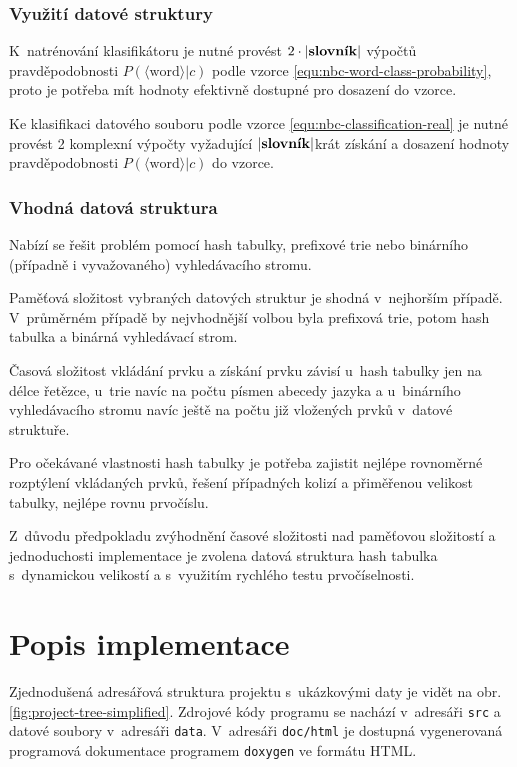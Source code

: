 \documentclass[a4paper, 12pt]{report}
\begin{document}
\subsection{Využití datové struktury}

K~natrénování klasifikátoru je nutné provést $2 \cdot 
|\text{\textbf{slovník}}|$ výpočtů pravděpodobnosti $P(\langle \text{word} 
\rangle|c)$ podle vzorce \ref{equ:nbc-word-class-probability}, proto je 
potřeba mít hodnoty efektivně dostupné pro dosazení do vzorce.

Ke klasifikaci datového souboru podle vzorce 
\ref{equ:nbc-classification-real} je nutné provést 2 komplexní výpočty 
vyžadující $|\text{\textbf{slovník}}|$krát získání a dosazení hodnoty 
pravděpodobnosti $P(\langle \text{word} \rangle|c)$ do vzorce.

\subsection{Vhodná datová struktura}

Nabízí se řešit problém pomocí hash tabulky, prefixové trie nebo binárního 
(případně i vyvažovaného) vyhledávacího stromu.

Paměťová složitost vybraných datových struktur je shodná v~nejhorším 
případě. V~průměrném případě by nejvhodnější volbou byla prefixová trie, 
potom hash tabulka a binárná vyhledávací strom.

Časová složitost vkládání prvku a získání prvku závisí u~hash tabulky jen 
na délce řetězce, u~trie navíc na počtu písmen abecedy jazyka a
u~binárního vyhledávacího stromu navíc ještě na počtu již vložených prvků
v~datové struktuře.

Pro očekávané vlastnosti hash tabulky je potřeba zajistit nejlépe 
rovnoměrné rozptýlení vkládaných prvků, řešení případných kolizí a 
přiměřenou velikost tabulky, nejlépe rovnu prvočíslu.

Z~důvodu předpokladu zvýhodnění časové složitosti nad paměťovou složitostí 
a jednoduchosti implementace je zvolena datová struktura hash tabulka
s~dynamickou velikostí a s~využitím rychlého testu prvočíselnosti.

\chapter{Popis implementace}

Zjednodušená adresářová struktura projektu s~ukázkovými daty je vidět na 
obr. \ref{fig:project-tree-simplified}. Zdrojové kódy programu se nachází 
v~adresáři \texttt{src} a datové soubory v~adresáři \texttt{data}.
V~adresáři \texttt{doc/html} je dostupná vygenerovaná programová dokumentace 
programem \texttt{doxygen} ve formátu HTML.
\end{document}
